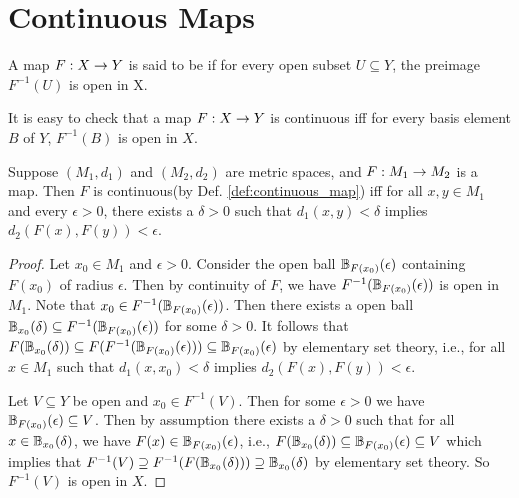 \documentclass[11pt,a4paper]{article}
\begin{document}
\section{Continuous Maps}

\begin{definition}\label{def:continuous_map}
    A map $F:X\rightarrow Y$ is said to be  if for every open subset $U\subseteq Y$, the preimage $F^{-1}(U)$ is open in X.
\end{definition}

\begin{remark}
It is easy to check that a map $F:X\rightarrow Y$ is continuous iff for every basis element $B$ of $Y$, $F^{-1}(B)$ is open in $X$.
\end{remark}

\begin{proposition}\label{prop:epsilon_delta_continuity}
Suppose $(M_1,d_1)$ and $(M_2,d_2)$ are metric spaces, and $F:M_1\rightarrow M_2$ is a map. Then $F$ is continuous(by Def. \ref{def:continuous_map}) iff for all $x,y\in M_1$ and every $\epsilon>0$, there exists a $\delta>0$ such that $d_1(x,y)<\delta$ implies $d_2(F(x),F(y))<\epsilon$.
\end{proposition}

\begin{proof}
\forward Let $x_0\in M_1$ and $\epsilon>0$. Consider the open ball $\mathbb{B}_{F(x_0)}(\epsilon)$ containing $F(x_0)$ of radius $\epsilon$. Then by continuity of $F$, we have $F^{-1}(\mathbb{B}_{F(x_0)}(\epsilon))$ is open in $M_1$. Note that $x_0\in F^{-1}(\mathbb{B}_{F(x_0)}(\epsilon))$. Then there exists a open ball $\mathbb{B}_{x_0}(\delta)\subseteq F^{-1}(\mathbb{B}_{F(x_0)}(\epsilon))$ for some $\delta>0$. It follows that $F(\mathbb{B}_{x_0}(\delta))\subseteq F(F^{-1}(\mathbb{B}_{F(x_0)}(\epsilon)))\subseteq \mathbb{B}_{F(x_0)}(\epsilon)$ by elementary set theory, i.e., for all $x\in M_1$ such that $d_1(x,x_0)<\delta$ implies $d_2(F(x),F(y))<\epsilon$.  

\noindent\converse Let $V\subseteq Y$ be open and $x_0\in F^{-1}(V)$. Then for some $\epsilon>0$ we have $\mathbb{B}_{F(x_0)}(\epsilon)\subseteq V$. Then by assumption there exists a $\delta>0$ such that for all $x\in \mathbb{B}_{x_0}(\delta)$, we have $F(x)\in \mathbb{B}_{F(x_0)}(\epsilon)$, i.e., $F(\mathbb{B}_{x_0}(\delta))\subseteq \mathbb{B}_{F(x_0)}(\epsilon)\subseteq V$ which implies that $F^{-1}(V)\supseteq F^{-1}(F(\mathbb{B}_{x_0}(\delta)))\supseteq \mathbb{B}_{x_0}(\delta)$ by elementary set theory. So $F^{-1}(V)$ is open in $X$.
\end{proof}
\end{document}
